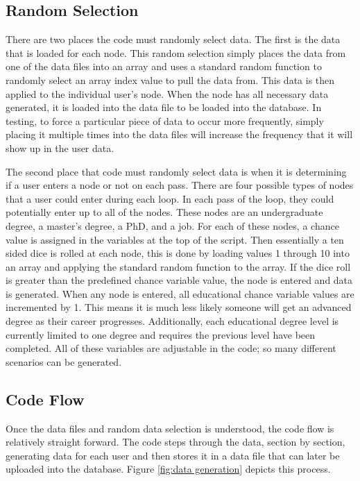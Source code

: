 \subsection{Random Selection}
There are two places the code must randomly select data.  The first is the
data that is loaded for each node.  This random selection simply places the data
from one of the data files into an array and uses a standard random function
to randomly select an array index value to pull the data from.  This data is then
applied to the individual user's node.  When the node has all necessary data
generated, it is loaded into the data file to be loaded into the database.  In
testing, to force a particular piece of data to occur more frequently,
simply placing it multiple times into the data files will increase the
frequency that it will show up in the user data.

The second place that code must randomly select data is when it is determining
if a user enters a node or not on each pass.  There are four possible types
of nodes that a user could enter during each loop.  In each pass of the loop,
they could potentially enter up to all of the nodes.  These nodes are an
undergraduate degree, a master's degree, a PhD, and a job.  For each of these
nodes, a chance value is assigned in the variables at the top of the script. 
Then essentially a ten sided dice is rolled at each node, this is done by
loading values 1 through 10 into an array and applying the standard random
function to the array.  If the dice roll is greater than the predefined chance
variable value, the node is entered and data is generated.  When any node is
entered, all educational chance variable values are incremented by 1.  This
means it is much less likely someone will get an advanced degree as their career
progresses.  Additionally, each educational degree level is currently limited to
one degree and requires the previous level have been completed.  All of these
variables are adjustable in the code; so many different scenarios can be generated.


\subsection{Code Flow}
Once the data files and random data selection is understood, the code flow is
relatively straight forward.  The code steps through the data, section by
section, generating data for each user and then stores it in a data file that
can later be uploaded into the database.  Figure \ref {fig:data generation}
depicts this process.

